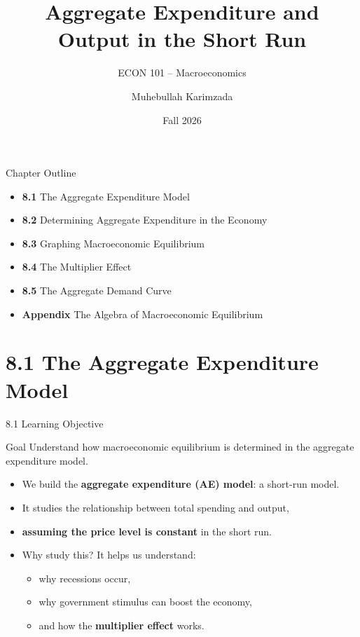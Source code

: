 \documentclass[aspectratio=169]{beamer}
\title{\textbf{Aggregate Expenditure and Output in the Short Run}}
\subtitle{{\large ECON 101 -- Macroeconomics}}
\author{Muhebullah Karimzada}
\date{Fall 2026}
\begin{document}

\begin{frame}[plain]
  \titlepage
\end{frame}

\begin{frame}{Chapter Outline}
\transfade
\begin{itemize}[<+->]
  \item \textbf{8.1} The Aggregate Expenditure Model
  \item \textbf{8.2} Determining Aggregate Expenditure in the Economy
  \item \textbf{8.3} Graphing Macroeconomic Equilibrium
  \item \textbf{8.4} The Multiplier Effect
  \item \textbf{8.5} The Aggregate Demand Curve
  \item \textbf{Appendix} The Algebra of Macroeconomic Equilibrium
\end{itemize}
\end{frame}

\section{8.1 The Aggregate Expenditure Model}

\begin{frame}{8.1 Learning Objective}
\transfade
\begin{block}{Goal}
Understand how macroeconomic equilibrium is determined in the aggregate expenditure model.
\end{block}
\begin{itemize}[<+->]
  \item We build the \textbf{aggregate expenditure (AE) model}: a short-run model.
  \item It studies the relationship between total spending and output,
  \item \textbf{assuming the price level is constant} in the short run.
  \item Why study this? It helps us understand:
  \begin{itemize}[<+->]
    \item why recessions occur,
    \item why government stimulus can boost the economy,
    \item and how the \textbf{multiplier effect} works.
  \end{itemize}
\end{itemize}
\end{frame}
\end{document}

